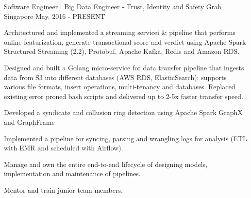 

\begin{cventries}

  \cventry
    {Software Engineer | Big Data Engineer - Trust, Identity and Safety} %
    {Grab} %
    {Singapore} %
    {May. 2016 - PRESENT} %
    {
      \begin{cvitems} %
      \item {Architectured and implemented a streaming servicei \& pipeline that
            performs online featurization, generate transactional score and
            verdict using Apache Spark Structured Streaming (2.2), Protobuf,
            Apache Kafka, Redis and Amazon RDS.}
        \item {Designed and built a Golang micro-service for data transfer
            pipeline that ingests data from S3 into different databases (AWS RDS,
            ElasticSearch); supports various file formats, insert operations,
            multi-tenancy and databases. Replaced existing error proned bash
            scripts and delivered up to 2-5x faster transfer speed.}
        \item {Developed a syndicate and collusion ring detection using Apache
            Spark GraphX and GraphFrame}
        \item {Implemented a pipeline for syncing, parsing and wrangling logs
            for analysis (ETL with EMR and scheduled with Airflow).}
        \item {Manage and own the entire end-to-end lifecycle of designing
            models, implementation and maintenance of pipelines.}
        \item {Mentor and train junior team members.}
      \end{cvitems}
    }


\end{cventries}
